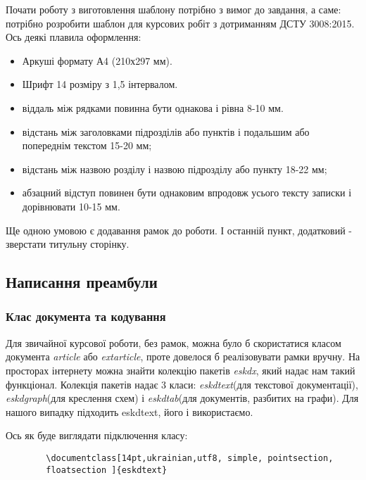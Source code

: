 
Почати роботу з виготовлення шаблону потрібно з вимог до завдання, а саме: потрібно розробити шаблон для курсових робіт з дотриманням ДСТУ 3008:2015. Ось деякі плавила оформлення:

\begin{itemize}
	\item Аркуші формату А4 (210х297 мм).
	\item Шрифт 14 розміру з 1,5 інтервалом.
	\item  віддаль між рядками повинна бути однакова і рівна 8-10 мм.
	\item  відстань між заголовками підрозділів або пунктів і подальшим або попереднім текстом 15-20 мм;
	\item  відстань між назвою розділу і назвою підрозділу або пункту 18-22 мм;
	\item  абзацний відступ повинен бути однаковим впродовж усього тексту записки і дорівнювати 10-15 мм.
\end{itemize}

Ще одною умовою є додавання рамок до роботи. І останній пункт, додатковий - зверстати титульну сторінку.

\subsection{Написання преамбули}

\subsubsection{Клас документа та кодування}

Для звичайної курсової роботи, без рамок, можна було б скористатися класом документа \textit{article} або \textit{extarticle}, проте довелося б реалізовувати рамки вручну. На просторах інтернету можна знайти колекцію пакетів \textit{eskdx}, який надає нам такий функціонал. Колекція пакетів надає 3 класи: \textit{eskdtext}(для текстової документації), \textit{eskdgraph}(для креслення схем) і \textit{eskdtab}(для документів, разбитих на графи). Для нашого випадку підходить eskdtext, його і використаємо.

\newpage

Ось як буде виглядати підключення класу:

\begin{lstlisting}
		\documentclass[14pt,ukrainian,utf8, simple, pointsection,
		floatsection ]{eskdtext} 
\end{lstlisting}

